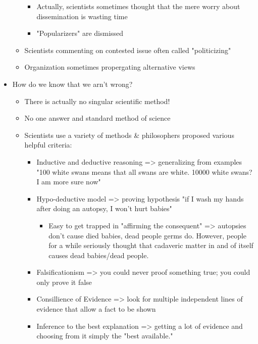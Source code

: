 \documentclass[letterpaper]{article}
\begin{document}
\begin{itemize}
\begin{itemize}
\begin{itemize}
\item Actually, scientists sometimes thought that the mere worry about
dissemination is wasting time
\item "Popularizers" are dismissed
\end{itemize}

\item Scientists commenting on contested issue often called "politicizing"
\item Organization sometimes propergating alternative views
\end{itemize}

\item How do we know that we arn't wrong?

\begin{itemize}
\item There is actually no singular scientific method!
\item No one answer and standard method of science
\item Scientists use a variety of methods \& philosophers proposed various
helpful criteria:

\begin{itemize}
\item Inductive and deductive reasoning => generalizing from examples
"100 white swans means that all swans are white. 10000 white
swans? I am more sure now"
\item Hypo-deductive model => proving hypothesis "if I wash my hands
after doing an autopsy, I won't hurt babies"

\begin{itemize}
\item Easy to get trapped in "affirming the consequent" => autopsies
don't cause died babies, dead people germs do. However, people
for a while seriously thought that cadaveric matter in and of
itself causes dead babies/dead people.
\end{itemize}

\item Falsificationism => you could never proof something true; you
could only prove it false
\item Consillience of Evidence => look for multiple independent lines of
evidence that allow a fact to be shown
\item Inference to the best explanation => getting a lot of evidence and
choosing from it simply the "best available."
\end{itemize}
\end{itemize}
\end{itemize}
\end{document}
